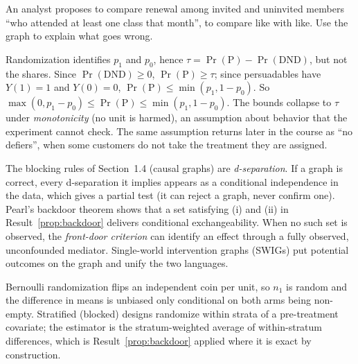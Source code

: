 \documentclass[11pt]{article}
\begin{document}
\begin{exercise}[judgment]
An analyst proposes to compare renewal among invited and uninvited members ``who attended at least one
class that month'', to compare like with like. Use the graph to explain what goes wrong.
\end{exercise}

\sectionthree

\begin{extension}
Randomization identifies $p_1$ and $p_0$, hence $\tau = \Pr(\text{P}) - \Pr(\text{DND})$, but not the
shares. Since $\Pr(\text{DND}) \ge 0$, $\Pr(\text{P}) \ge \tau$; since persuadables have $Y(1)=1$ and
$Y(0)=0$, $\Pr(\text{P}) \le \min(p_1, 1-p_0)$. So $\max(0, p_1 - p_0) \le \Pr(\text{P}) \le \min(p_1, 1-p_0)$.
The bounds collapse to $\tau$ under \emph{monotonicity} (no unit is harmed), an assumption about behavior
that the experiment cannot check. The same assumption returns later in the course as ``no defiers'', when
some customers do not take the treatment they are assigned.
\end{extension}

\begin{extension}
The blocking rules of Section~1.4 (causal graphs) are \emph{d-separation}. If a graph is correct, every d-separation it
implies appears as a conditional independence in the data, which gives a partial test (it can reject a
graph, never confirm one). Pearl's backdoor theorem shows that a set satisfying (i) and (ii) in
Result~\ref{prop:backdoor} delivers conditional exchangeability. When no such set is observed, the
\emph{front-door criterion} can identify an effect through a fully observed, unconfounded mediator.
Single-world intervention graphs (SWIGs) put potential outcomes on the graph and unify the two languages.
\end{extension}

\begin{extension}
Bernoulli randomization flips an independent coin per unit, so $n_1$ is random and the difference in means
is unbiased only conditional on both arms being non-empty. Stratified (blocked) designs randomize within
strata of a pre-treatment covariate; the estimator is the stratum-weighted average of within-stratum
differences, which is Result~\ref{prop:backdoor} applied where it is exact by construction.
\end{extension}
\end{document}
